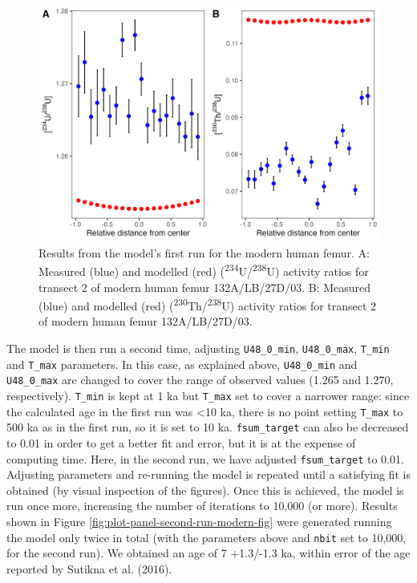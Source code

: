 \documentclass[]{elsarticle} %
\begin{document}
\begin{figure}
\includegraphics[width=0.95\linewidth]{figures/plot-panel-first-run-modern} \caption{Results from the model's first run for the modern human femur. A: Measured (blue) and modelled (red) (\textsuperscript{234}U/\textsuperscript{238}U) activity ratios for transect 2 of modern human femur 132A/LB/27D/03. B: Measured (blue) and modelled (red) (\textsuperscript{230}Th/\textsuperscript{238}U) activity ratios for transect 2 of modern human femur 132A/LB/27D/03.}\label{fig:plot-panel-first-run-modern-fig}
\end{figure}

\FloatBarrier

The model is then run a second time, adjusting \texttt{U48\_0\_min}, \texttt{U48\_0\_max}, \texttt{T\_min} and \texttt{T\_max} parameters. In this case, as explained above, \texttt{U48\_0\_min} and \texttt{U48\_0\_max} are changed to cover the range of observed values (1.265 and 1.270, respectively). \texttt{T\_min} is kept at 1 ka but \texttt{T\_max} set to cover a narrower range: since the calculated age in the first run was \textless10 ka, there is no point setting \texttt{T\_max} to 500 ka as in the first run, so it is set to 10 ka. \texttt{fsum\_target} can also be decreased to 0.01 in order to get a better fit and error, but it is at the expense of computing time. Here, in the second run, we have adjusted \texttt{fsum\_target} to 0.01.
Adjusting parameters and re-running the model is repeated until a satisfying fit is obtained (by visual inspection of the figures). Once this is achieved, the model is run once more, increasing the number of iterations to 10,000 (or more). Results shown in Figure \ref{fig:plot-panel-second-run-modern-fig} were generated running the model only twice in total (with the parameters above and \texttt{nbit} set to 10,000, for the second run). We obtained an age of 7 +1.3/-1.3 ka, within error of the age reported by Sutikna et al. (2016).
\end{document}
